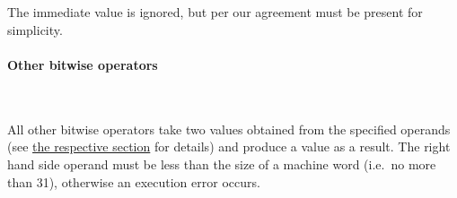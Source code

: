 \paragraph{}\

The immediate value is ignored, but per our agreement must be present for simplicity.

\vspace{-0.35cm}

\paragraph{Other bitwise operators}\

All other bitwise operators take two  values obtained from the specified operands (see \hyperlink{types:twos_complement}{the respective section} for details) and produce a  value as a result. The right hand side operand must be less than the size of a machine word (i.e.\ no more than 31), otherwise an execution error occurs.